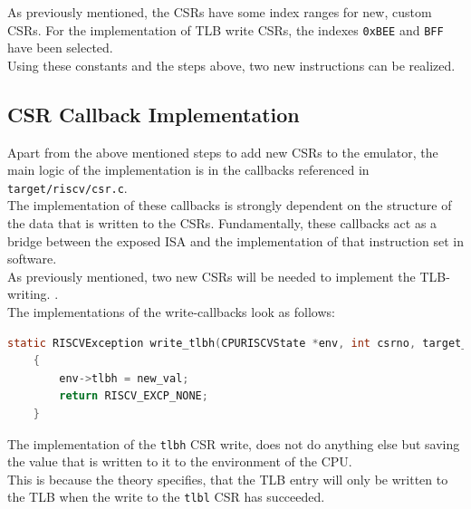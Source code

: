 As previously mentioned, the CSRs have some index ranges for new, custom CSRs. For the implementation
of TLB write CSRs, the indexes \texttt{0xBEE} and \texttt{BFF} have been selected.\\
Using these constants and the steps above, two new instructions can be realized.

\subsection{CSR Callback Implementation} Apart from the above mentioned steps to add new CSRs to the emulator, the
main logic of the implementation is in the callbacks referenced in \texttt{target/riscv/csr.c}.\\
The implementation of these callbacks is strongly dependent on the structure of the data that is written to
the CSRs. Fundamentally, these callbacks act as a bridge between the exposed ISA and the implementation of
that instruction set in software.\\
As previously mentioned, two new CSRs will be needed to implement the TLB-writing. .\\
The implementations
of the write-callbacks look as follows:



\begin{lstlisting}[language=c,float=h!,
    label={lst:tlbh}]
    static RISCVException write_tlbh(CPURISCVState *env, int csrno, target_ulong new_val)
    {
        env->tlbh = new_val;
        return RISCV_EXCP_NONE;
    }
\end{lstlisting}
The implementation of the \texttt{tlbh} CSR write, does not do anything else but saving the value
that is written to it to the environment of the CPU.\\
This is because the theory specifies, that the TLB entry will only
be written to the TLB when the write to the \texttt{tlbl} CSR has succeeded.

